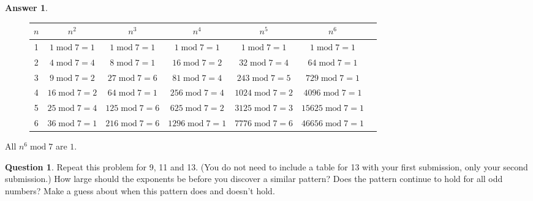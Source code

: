 \documentclass[article, 12pt]{article}
\theoremstyle{definition}
\newtheorem{question}{Question}
\newtheorem{answer}{Answer}
\newcommand{\Mod}[1]{\;\mathrm{mod}\; #1} %
\begin{document}
    \begin{answer} \
        \begin{figure}[H]
            \centering
            \begin{tabular}{|c|c|c|c|c|c|c|}
                \hline
                $n$ & $n^2$ & $n^3$ & $n^4$ & $n^5$ & $n^6$ \\
                \hline
                1 & $ 1 \Mod{7} = 1 $ & $ 1 \Mod{7} = 1 $ & $ 1 \Mod{7} = 1 $ & $ 1 \Mod{7} = 1 $ & $ 1 \Mod{7} = 1 $\\
                2 & $ 4 \Mod{7} = 4 $ & $ 8 \Mod{7} = 1 $ & $ 16 \Mod{7} = 2 $ & $ 32 \Mod{7} = 4 $ & $ 64 \Mod{7} = 1 $\\
                3 & $ 9 \Mod{7} = 2 $ & $27 \Mod{7} = 6 $ & $81 \Mod{7} = 4 $ & $243 \Mod{7} = 5 $ & $729 \Mod{7} = 1 $\\
                4 & $ 16 \Mod{7} = 2 $ & $64 \Mod{7} = 1 $ & $256 \Mod{7} = 4 $ & $1024 \Mod{7} = 2 $ & $4096 \Mod{7} = 1 $ \\
                5 & $ 25 \Mod{7} = 4 $ & $125 \Mod{7} = 6 $ & $625 \Mod{7} = 2 $ & $3125 \Mod{7} = 3 $ & $15625 \Mod{7} = 1 $ \\
                6 & $ 36 \Mod{7} = 1 $ & $216 \Mod{7} = 6 $ & $1296 \Mod{7} = 1 $ & $7776 \Mod{7} = 6 $ & $46656 \Mod{7} = 1 $ \\
                \hline
            \end{tabular}
        \end{figure}
        All $n^6 \Mod{7}$ are $1$.
    \end{answer}
    \begin{question}
        Repeat this problem for 9, 11 and 13. (You do not need to include a table for 13 with your first submission, only your second submission.) How large should the exponents be before you discover a similar pattern? Does the pattern continue to hold for all odd numbers? Make a guess about when this pattern does and doesn't hold.
    \end{question}
\end{document}

